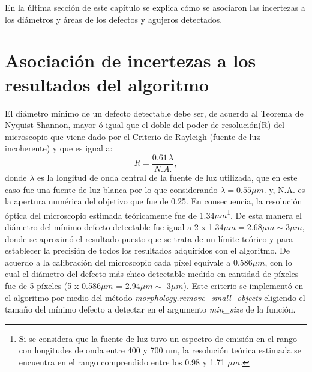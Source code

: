 En la última sección de este capítulo se explica cómo se asociaron las incertezas a los diámetros y áreas de los defectos y agujeros detectados.

\singlespacing
\section{Asociación de incertezas a los resultados del algoritmo}
\label{sec:incert}

\hspace{0.5cm} El diámetro mínimo de un defecto detectable debe ser, de acuerdo al Teorema de Nyquist-Shannon, mayor ó igual que el doble del poder de resolución(R) del microscopio que viene dado por el Criterio de Rayleigh (fuente de luz incoherente) y que es igual a:
\begin{equation}
R = \frac{0.61 \hspace{2pt} \lambda}{ N.A.},
\label{eq:rayleighcrit}
\end{equation}
donde $\lambda$ es la longitud de onda central de la fuente de luz utilizada, que en este caso fue una fuente de luz blanca por lo que considerando $\lambda = 0.55 \mu m$. y, N.A. es la apertura numérica del objetivo que fue de 0.25. En consecuencia, la resolución óptica del microscopio estimada teóricamente fue de 1.34$\mu m$\footnote{Si se considera que la fuente de luz tuvo un espectro de emisión en el rango con longitudes de onda entre 400 y 700 nm, la resolución teórica estimada se encuentra en el rango comprendido entre los 0.98 y 1.71 $\mu m$.}. De esta manera el diámetro del mínimo defecto detectable fue igual a 2 x 1.34$\mu m = 2.68 \mu m \sim 3 \mu m$, donde se aproximó el resultado puesto que se trata de un límite teórico y para establecer la precisión de todos los resultados adquiridos con el algoritmo. De acuerdo a la calibración del microscopio cada píxel equivale a 0.586$\mu m$, con lo cual el diámetro del defecto más chico detectable medido en cantidad de píxeles fue de 5 píxeles (5 x 0.586$\mu m$ = 2.94$\mu m \sim$ 3$\mu m$). Este criterio se implementó en el algoritmo por medio del método \textit{morphology.remove\_small\_objects} eligiendo el tamaño del mínimo defecto a detectar en el argumento \textit{min\_size} de la función.

